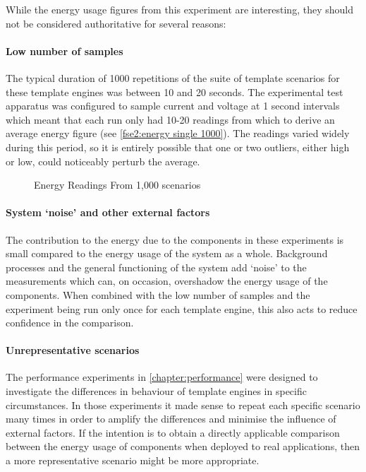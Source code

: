 While the energy usage figures from this experiment are interesting, they should not be considered authoritative for several reasons:

\paragraph{Low number of samples}
The typical duration of 1000 repetitions of the suite of template scenarios for these template engines was between 10 and 20 seconds. The experimental test apparatus was configured to sample current and voltage at 1 second intervals which meant that each run only had 10-20 readings from which to derive an average energy figure (see \autoref{fse2:energy single 1000}). The readings varied widely during this period, so it is entirely possible that one or two outliers, either high or low, could noticeably perturb the average.

\begin{figure}[htbp]
  \centering
  
  \caption{Energy Readings From 1,000 scenarios}
  \label{fse2:energy single 1000}
\end{figure}

\paragraph{System `noise' and other external factors}
The contribution to the energy due to the components in these experiments is small compared to the energy usage of the system as a whole. Background processes and the general functioning of the system add `noise' to the measurements which can, on occasion, overshadow the energy usage of the components. When combined with the low number of samples and the experiment being run only once for each template engine, this also acts to reduce confidence in the comparison.

\paragraph{Unrepresentative scenarios}
The performance experiments in \autoref{chapter:performance} were designed to investigate the differences in behaviour of template engines in specific circumstances. In those experiments it made sense to repeat each specific scenario many times in order to amplify the differences and minimise the influence of external factors. If the intention is to obtain a directly applicable comparison between the energy usage of components when deployed to real applications, then a more representative scenario might be more appropriate.

